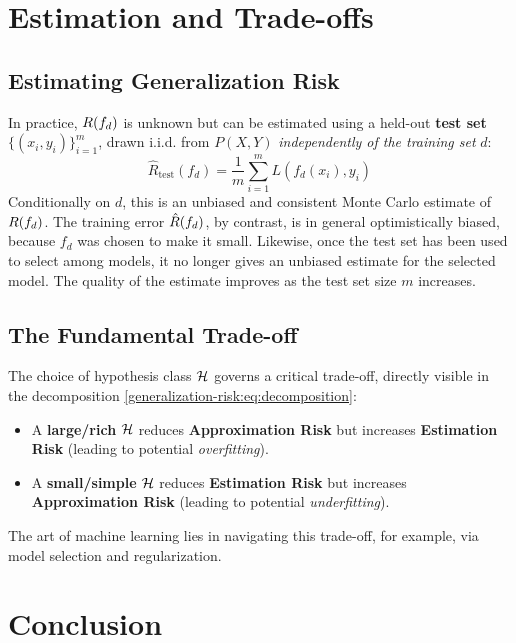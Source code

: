 \begin{notechapter}
\section{Estimation and Trade-offs}
\label{generalization-risk:sec:estimation_tradeoffs}

\subsection{Estimating Generalization Risk}
In practice, \( R(f_d) \) is unknown but can be estimated using a held-out \textbf{test set} \( \{(x_i, y_i)\}_{i=1}^m \), drawn i.i.d. from \( P(X, Y) \) \emph{independently of the training set} \( d \):
\[
\hat{R}_{\text{test}}(f_d) = \frac{1}{m} \sum_{i=1}^m L(f_d(x_i), y_i)
\]
Conditionally on \( d \), this is an unbiased and consistent Monte Carlo estimate of \( R(f_d) \). The training error \( \hat{R}(f_d) \), by contrast, is in general optimistically biased, because \( f_d \) was chosen to make it small. Likewise, once the test set has been used to select among models, it no longer gives an unbiased estimate for the selected model. The quality of the estimate improves as the test set size \( m \) increases.

\subsection{The Fundamental Trade-off}
The choice of hypothesis class \( \mathcal{H} \) governs a critical trade-off, directly visible in the decomposition \eqref{generalization-risk:eq:decomposition}:
\begin{itemize}
    \item A \textbf{large/rich} \( \mathcal{H} \) reduces \textbf{Approximation Risk} but increases \textbf{Estimation Risk} (leading to potential \emph{overfitting}).
    \item A \textbf{small/simple} \( \mathcal{H} \) reduces \textbf{Estimation Risk} but increases \textbf{Approximation Risk} (leading to potential \emph{underfitting}).
\end{itemize}
The art of machine learning lies in navigating this trade-off, for example, via model selection and regularization.

\section{Conclusion}
\label{generalization-risk:sec:conclusion}


\end{notechapter}
